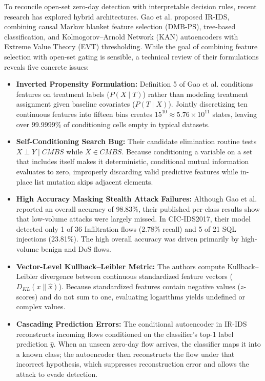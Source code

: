 \documentclass[10pt,journal,compsoc]{IEEEtran}
\begin{document}
To reconcile open-set zero-day detection with interpretable decision rules, recent research has explored hybrid architectures. Gao et al. \cite{gao2025} proposed IR-IDS, combining causal Markov blanket feature selection (DMB-PS), tree-based classification, and Kolmogorov--Arnold Network (KAN) autoencoders with Extreme Value Theory (EVT) thresholding. While the goal of combining feature selection with open-set gating is sensible, a technical review of their formulations reveals five concrete issues:
\begin{itemize}
    \item \textbf{Inverted Propensity Formulation:} Definition 5 of Gao et al. conditions features on treatment labels ($P(X \mid T)$) rather than modeling treatment assignment given baseline covariates ($P(T \mid X)$). Jointly discretizing ten continuous features into fifteen bins creates $15^{10} \approx 5.76 \times 10^{11}$ states, leaving over 99.9999\% of conditioning cells empty in typical datasets.
    \item \textbf{Self-Conditioning Search Bug:} Their candidate elimination routine tests $X \perp Y \mid CMBS$ while $X \in CMBS$. Because conditioning a variable on a set that includes itself makes it deterministic, conditional mutual information evaluates to zero, improperly discarding valid predictive features while in-place list mutation skips adjacent elements.
    \item \textbf{High Accuracy Masking Stealth Attack Failures:} Although Gao et al. reported an overall accuracy of 98.83\%, their published per-class results show that low-volume attacks were largely missed. In CIC-IDS2017, their model detected only 1 of 36 Infiltration flows (2.78\% recall) and 5 of 21 SQL injections (23.81\%). The high overall accuracy was driven primarily by high-volume benign and DoS flows.
    \item \textbf{Vector-Level Kullback--Leibler Metric:} The authors compute Kullback--Leibler divergence between continuous standardized feature vectors ($D_{KL}(x \parallel \hat{x})$). Because standardized features contain negative values ($z$-scores) and do not sum to one, evaluating logarithms yields undefined or complex values.
    \item \textbf{Cascading Prediction Errors:} The conditional autoencoder in IR-IDS reconstructs incoming flows conditioned on the classifier's top-1 label prediction $\hat{y}$. When an unseen zero-day flow arrives, the classifier maps it into a known class; the autoencoder then reconstructs the flow under that incorrect hypothesis, which suppresses reconstruction error and allows the attack to evade detection.
\end{itemize}
\end{document}
